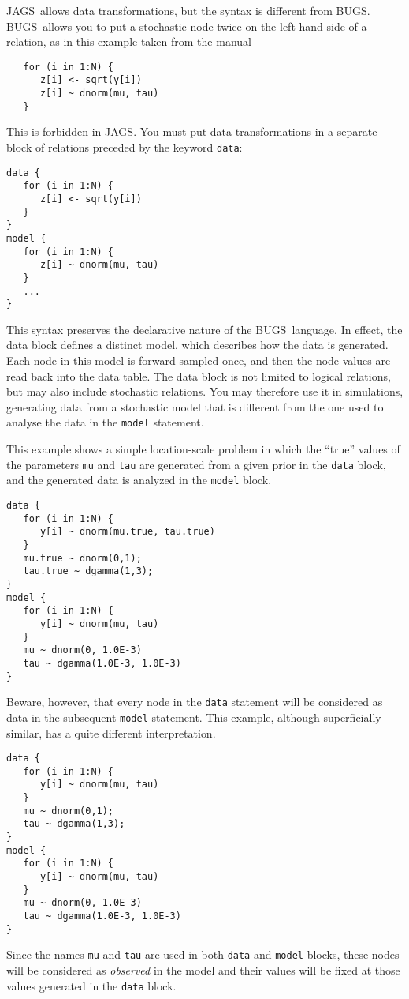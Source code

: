 \documentclass[11pt, a4paper, titlepage]{report}
\newcommand{\JAGS}{\textsf{JAGS}}
\newcommand{\BUGS}{\textsf{BUGS}}
\begin{document}
\JAGS\ allows data transformations, but the syntax is different from
\BUGS.  \BUGS\ allows you to put a stochastic node twice on the left
hand side of a relation, as in this example taken from the manual
\begin{verbatim}
   for (i in 1:N) {
      z[i] <- sqrt(y[i])
      z[i] ~ dnorm(mu, tau)
   }
\end{verbatim}
This is forbidden in \JAGS. You must put data transformations in a 
separate block of relations preceded by the keyword \texttt{data}:
\begin{verbatim}
data {
   for (i in 1:N) {
      z[i] <- sqrt(y[i])
   }
}
model {
   for (i in 1:N) {
      z[i] ~ dnorm(mu, tau)
   }
   ...
}
\end{verbatim}
This syntax preserves the declarative nature of the \BUGS\ language.
In effect, the data block defines a distinct model, which describes
how the data is generated. Each node in this model is forward-sampled
once, and then the node values are read back into the data table. The
data block is not limited to logical relations, but may also include
stochastic relations. You may therefore use it in simulations,
generating data from a stochastic model that is different from the one
used to analyse the data in the \texttt{model} statement.

This example shows a simple location-scale problem in which the ``true''
values of the parameters \texttt{mu} and \texttt{tau} are generated
from a given prior in the \texttt{data} block, and the generated
data is analyzed in the \texttt{model} block.
\begin{verbatim}
data {
   for (i in 1:N) {
      y[i] ~ dnorm(mu.true, tau.true) 
   }
   mu.true ~ dnorm(0,1);
   tau.true ~ dgamma(1,3);
}
model {
   for (i in 1:N) {
      y[i] ~ dnorm(mu, tau)
   }
   mu ~ dnorm(0, 1.0E-3)
   tau ~ dgamma(1.0E-3, 1.0E-3)
}
\end{verbatim}
Beware, however, that every node in the \texttt{data} statement will
be considered as data in the subsequent \texttt{model} statement. This
example, although superficially similar, has a quite different interpretation.
\begin{verbatim}
data {
   for (i in 1:N) {
      y[i] ~ dnorm(mu, tau) 
   }
   mu ~ dnorm(0,1);
   tau ~ dgamma(1,3);
}
model {
   for (i in 1:N) {
      y[i] ~ dnorm(mu, tau)
   }
   mu ~ dnorm(0, 1.0E-3)
   tau ~ dgamma(1.0E-3, 1.0E-3)
}
\end{verbatim}
Since the names \texttt{mu} and \texttt{tau} are used in both
\texttt{data} and \texttt{model} blocks, these nodes will be
considered as {\em observed} in the model and their values will be
fixed at those values generated in the \texttt{data} block.
\end{document}
